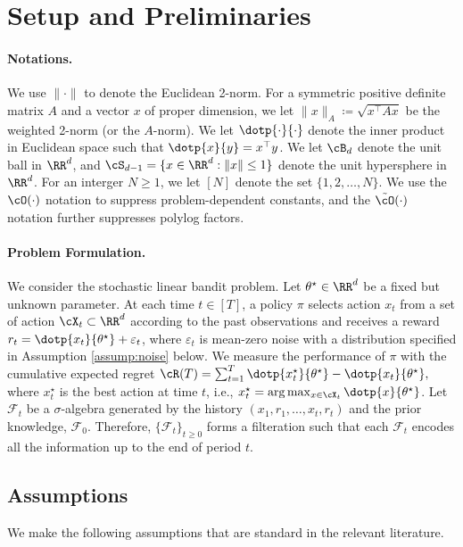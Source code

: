 \section{Setup and Preliminaries}

\paragraph{Notations.} We use $\|\cdot\|$ to denote the Euclidean 2-norm. For a symmetric positive definite matrix $A$ and a vector $x$ of proper dimension, we let $\|x\|_{A}\coloneqq \sqrt{x^\top A x}$ be the weighted 2-norm (or the $A$-norm). We let $\dotp{\cdot}{\cdot}$ denote the inner product in Euclidean  space such that $\dotp{x}{y} = x^\top y$. We let $\cB_d $ denote the unit ball in $\RR^d$, and $\cS_{d-1} = \{x\in\RR^d:\|x\| \leq  1\}$ denote the unit hypersphere in  $\RR^d$. For an interger $N\geq 1$, we let $[N]$ denote the set $\{1,2,\dots,N\}$. We use the $\cO(\cdot	)$ notation to suppress problem-dependent constants, and the $\tilde{\cO}(\cdot)$ notation further suppresses polylog factors.

\paragraph{Problem Formulation.} We consider the stochastic linear bandit problem. Let $\theta^\star \in \RR^d$ be a fixed but unknown parameter. At each time $t\in[T]$, a policy $\pi$  selects action $x_t$ from a set of action  $\cX_t \subset \RR^d $ according to the past observations and receives a reward $r_t  = \dotp{x_t}{\theta^\star} + \varepsilon_t$, where $ \varepsilon_t$ is mean-zero noise with a distribution specified in Assumption \ref{assump:noise} below. We measure the performance of $\pi$ with the cumulative expected regret 
%
$\cR(T) = \sum_{t= 1}^T\dotp{x^{\star}_t}{\theta^\star} -  \dotp{x_t}{\theta^\star},$
%
where $x^{\star}_t$ is the best action at time $t$, i.e., $x^{\star}_t=\arg\max_{x \in \cX_t}\dotp{x}{\theta^\star}$.
Let $\mathcal{F}_t$ be a $\sigma$-algebra generated by the history $(x_1, r_1, \ldots, x_t, r_t)$ and the prior knowledge, $\mathcal{F}_0$. Therefore, $\{\mathcal{F}_t\}_{t\ge 0}$ forms a filteration such that each $\mathcal{F}_t$ encodes all the information up to the end of period $t$.



\subsection{Assumptions}
We make the following assumptions that are standard in the relevant literature.

